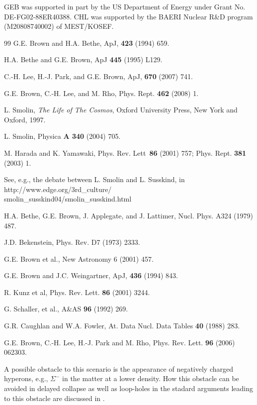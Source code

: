 \documentclass[aps,twocolumn,preprintnumbers,%
superscriptaddress,floatfix]{revtex4}
\begin{document}
 GEB was supported in part by the US
Department of Energy under Grant No. DE-FG02-88ER40388.
CHL was supported by the BAERI Nuclear R\&D program (M20808740002) of MEST/KOSEF.


\begin{thebibliography}{99}
 G.E. Brown and H.A. Bethe, ApJ, {\bf 423} (1994) 659.

 H.A. Bethe and G.E. Brown, ApJ {\bf 445} (1995) L129.

 C.-H. Lee, H.-J. Park, and G.E. Brown, ApJ, {\bf 670} (2007) 741.

 G.E. Brown, C.-H. Lee, and M. Rho,  Phys. Rept. {\bf 462} (2008) 1.

 L. Smolin, {\it The Life of The Cosmos}, Oxford University Press, New York and Oxford, 1997.

 L. Smolin, Physica {\bf A 340} (2004) 705.



 M. Harada and K. Yamawaki, { Phys.  Rev. Lett}\ {\bf 86} (2001) 757;  {Phys. Rept.} {\bf 381} (2003) 1.

 See, e.g., the debate between L. Smolin and L. Susskind, in
 http://www.edge.org/3rd\_culture/ \\ smolin\_susskind04/smolin\_susskind.html


 H.A. Bethe, G.E. Brown, J. Applegate, and J. Lattimer, Nucl. Phys. A324 (1979) 487.

 J.D. Bekenstein, Phys. Rev. D7 (1973) 2333.


 G.E. Brown et al., New Astronomy 6 (2001) 457.



 G.E. Brown and J.C. Weingartner, ApJ, {\bf 436}  (1994) 843.

 R. Kunz et al, Phys. Rev. Lett. {\bf 86} (2001) 3244.

G. Schaller, et al., A\&AS {\bf 96} (1992) 269.

G.R. Caughlan and W.A. Fowler, At. Data Nucl. Data Tables {\bf 40} (1988) 283.


  G.E. Brown, C.-H. Lee, H.-J. Park and  M. Rho,  Phys. Rev. Lett. {\bf 96} (2006) 062303.

A possible obstacle to this scenario is the appearance of negatively
charged hyperons, e.g., $\Sigma^-$ in the matter at a lower density.
How this obstacle can be avoided in delayed collapse as well as
loop-holes in the stadard arguments leading to this obstacle are
discussed in \cite{BLR-kaon07}.


\end{thebibliography}
\end{document}
